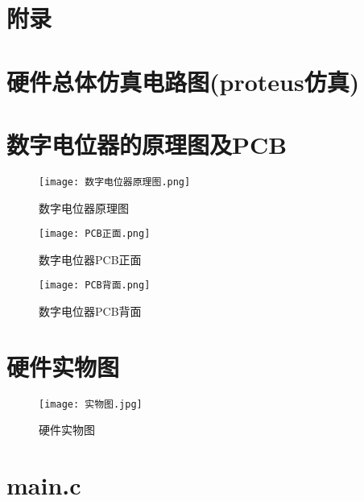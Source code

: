 \documentclass[lang=cn,11pt,a4paper]{elegantpaper}
\begin{document}
\section{附录}
\begin{appendices}
  \section{硬件总体仿真电路图(proteus仿真)}
  

  \section{数字电位器的原理图及PCB}
  \begin{figure}[!htb]
    \centering
    \texttt{[image: 数字电位器原理图.png]}
    \caption{数字电位器原理图}
    \label{fig:数字电位器原理图}
  \end{figure}

  \begin{figure}[H]
    \centering
    \texttt{[image: PCB正面.png]}
    \caption{数字电位器PCB正面}
    \label{fig:PCB正面}
  \end{figure}

  \begin{figure}[H]
    \centering
    \texttt{[image: PCB背面.png]}
    \caption{数字电位器PCB背面}
    \label{fig:PCB背面}
  \end{figure}

  \section{硬件实物图}
  \begin{figure}[H]
    \centering
    \texttt{[image: 实物图.jpg]}
    \caption{硬件实物图}
    \label{fig:实物图}
  \end{figure}

  \section{main.c}
  
\end{appendices}
\end{document}
